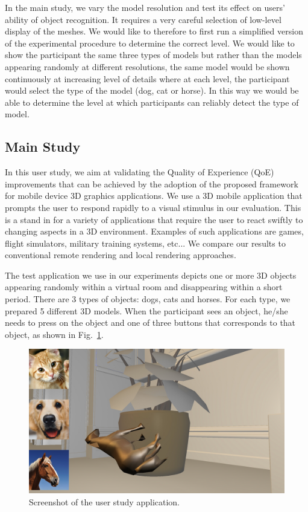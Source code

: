 In the main study, we vary the model resolution and test its effect on users' ability of object recognition.
It requires a very careful selection of low-level display of the meshes. We would like to therefore to first run a simplified version of the experimental procedure to determine the correct level. We would like to show the participant the same three types of models but rather than the models appearing randomly at different resolutions, the same model would be shown continuously at increasing level of details where at each level, the participant would select the type of the model (dog, cat or horse). In this way we would be able to determine the level at which participants can reliably detect the type of model.

\subsection{Main Study}

In this user study, we aim at validating the Quality of Experience (QoE) improvements that can be achieved by the adoption of the proposed framework for mobile device 3D graphics applications. We use a 3D mobile application that prompts the user to respond rapidly to a visual stimulus in our evaluation. This is a stand in for a variety of applications that require the user to react swiftly to changing aspects in a 3D environment. Examples of such applications are games, flight simulators, military training systems, etc... We compare our results to conventional remote rendering and local rendering approaches.

The test application we use in our experiments depicts one or more 3D objects appearing randomly within a virtual room and disappearing within a short period.  There are 3 types of objects: dogs, cats and horses. For each type, we prepared 5 different 3D models. When the participant sees an object, he/she needs to press on the object and one of three buttons that corresponds to that object, as shown in Fig.~\ref{fig:us}.

\begin{figure}[!htbp]
	\centering
	\includegraphics[width=\columnwidth]{figures/user_study.png}
	\caption{Screenshot of the user study application.}
	\label{fig:us}
\end{figure}

